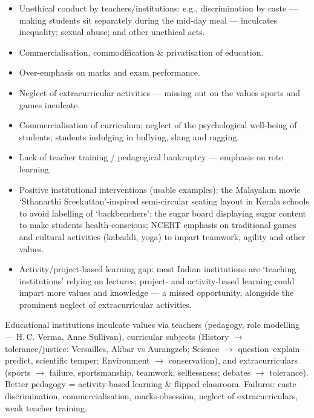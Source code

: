 \begin{itemize}
\item Unethical conduct by teachers/institutions: e.g., discrimination by caste --- making students sit separately during the mid-day meal --- inculcates inequality; sexual abuse; and other unethical acts.
\item Commercialisation, commodification \& privatisation of education.
\item Over-emphasis on marks and exam performance.
\item Neglect of extracurricular activities --- missing out on the values sports and games inculcate.
\item Commercialisation of curriculum; neglect of the psychological well-being of students; students indulging in bullying, slang and ragging.
\item Lack of teacher training / pedagogical bankruptcy --- emphasis on rote learning.
\end{itemize}

\begin{GovtPolicy}
\begin{itemize}
\item Positive institutional interventions (usable examples): the Malayalam movie `Sthanarthi Sreekuttan'-inspired semi-circular seating layout in Kerala schools to avoid labelling of `backbenchers'; the sugar board displaying sugar content to make students health-conscious; NCERT emphasis on traditional games and cultural activities (kabaddi, yoga) to impart teamwork, agility and other values.
\item Activity/project-based learning gap: most Indian institutions are `teaching institutions' relying on lectures; project- and activity-based learning could impart more values and knowledge --- a missed opportunity, alongside the prominent neglect of extracurricular activities.
\end{itemize}
\end{GovtPolicy}

\begin{QuickRevision}
Educational institutions inculcate values via teachers (pedagogy, role modelling --- H.\,C. Verma, Anne Sullivan), curricular subjects (History $\rightarrow$ tolerance/justice: Versailles, Akbar vs Aurangzeb; Science $\rightarrow$ question--explain--predict, scientific temper; Environment $\rightarrow$ conservation), and extracurriculars (sports $\rightarrow$ failure, sportsmanship, teamwork, selflessness; debates $\rightarrow$ tolerance). Better pedagogy = activity-based learning \& flipped classroom. Failures: caste discrimination, commercialisation, marks-obsession, neglect of extracurriculars, weak teacher training.
\end{QuickRevision}

